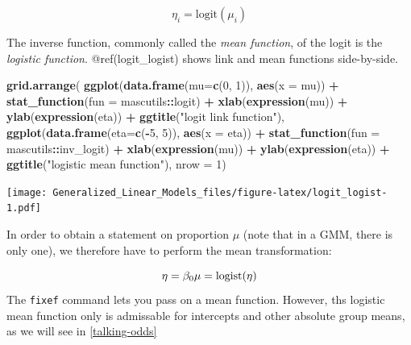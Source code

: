 \documentclass[]{svmono}
\newenvironment{Shaded}{\begin{snugshade}}{\end{snugshade}}
\newcommand{\KeywordTok}[1]{\textcolor[rgb]{0.13,0.29,0.53}{\textbf{#1}}}
\newcommand{\DataTypeTok}[1]{\textcolor[rgb]{0.13,0.29,0.53}{#1}}
\newcommand{\DecValTok}[1]{\textcolor[rgb]{0.00,0.00,0.81}{#1}}
\newcommand{\StringTok}[1]{\textcolor[rgb]{0.31,0.60,0.02}{#1}}
\newcommand{\OperatorTok}[1]{\textcolor[rgb]{0.81,0.36,0.00}{\textbf{#1}}}
\newcommand{\NormalTok}[1]{#1}
\theoremstyle{definition}
\theoremstyle{definition}
\theoremstyle{definition}
\theoremstyle{remark}
\begin{document}
\[
\eta_i = \textrm{logit}(\mu_i)
\]

The inverse function, commonly called the \emph{mean function}, of the
logit is the \emph{logistic function}. @ref(logit\_logist) shows link
and mean functions side-by-side.

\begin{Shaded}
\begin{Highlighting}[]
\KeywordTok{grid.arrange}\NormalTok{(}
  \KeywordTok{ggplot}\NormalTok{(}\KeywordTok{data.frame}\NormalTok{(}\DataTypeTok{mu=}\KeywordTok{c}\NormalTok{(}\DecValTok{0}\NormalTok{, }\DecValTok{1}\NormalTok{)), }\KeywordTok{aes}\NormalTok{(}\DataTypeTok{x =}\NormalTok{ mu)) }\OperatorTok{+}\StringTok{ }
\StringTok{    }\KeywordTok{stat_function}\NormalTok{(}\DataTypeTok{fun =}\NormalTok{ mascutils}\OperatorTok{::}\NormalTok{logit) }\OperatorTok{+}
\StringTok{    }\KeywordTok{xlab}\NormalTok{(}\KeywordTok{expression}\NormalTok{(mu)) }\OperatorTok{+}\StringTok{ }\KeywordTok{ylab}\NormalTok{(}\KeywordTok{expression}\NormalTok{(eta)) }\OperatorTok{+}
\StringTok{    }\KeywordTok{ggtitle}\NormalTok{(}\StringTok{"logit link function"}\NormalTok{),}
  \KeywordTok{ggplot}\NormalTok{(}\KeywordTok{data.frame}\NormalTok{(}\DataTypeTok{eta=}\KeywordTok{c}\NormalTok{(}\OperatorTok{-}\DecValTok{5}\NormalTok{, }\DecValTok{5}\NormalTok{)), }\KeywordTok{aes}\NormalTok{(}\DataTypeTok{x =}\NormalTok{ eta)) }\OperatorTok{+}\StringTok{ }
\StringTok{    }\KeywordTok{stat_function}\NormalTok{(}\DataTypeTok{fun =}\NormalTok{ mascutils}\OperatorTok{::}\NormalTok{inv_logit) }\OperatorTok{+}\StringTok{ }
\StringTok{    }\KeywordTok{xlab}\NormalTok{(}\KeywordTok{expression}\NormalTok{(mu)) }\OperatorTok{+}\StringTok{ }\KeywordTok{ylab}\NormalTok{(}\KeywordTok{expression}\NormalTok{(eta)) }\OperatorTok{+}
\StringTok{    }\KeywordTok{ggtitle}\NormalTok{(}\StringTok{"logistic mean function"}\NormalTok{),}
  \DataTypeTok{nrow =} \DecValTok{1}\NormalTok{)}
\end{Highlighting}
\end{Shaded}

\texttt{[image: Generalized\_Linear\_Models\_files/figure-latex/logit\_logist-1.pdf]}

In order to obtain a statement on proportion \(\mu\) (note that in a
GMM, there is only one), we therefore have to perform the mean
transformation:

\[
\eta = \beta_0\\
\mu = \textrm{logist}(\eta)
\] The \texttt{fixef} command lets you pass on a mean function. However,
ths logistic mean function only is admissable for intercepts and other
absolute group means, as we will see in \ref{talking-odds}
\end{document}
